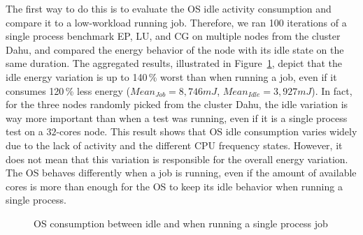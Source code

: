 The first way to do this is to evaluate the OS idle activity consumption and compare it to a low-workload running job.
Therefore, we ran 100 iterations of a single process benchmark \textsf{EP}, \textsf{LU}, and \textsf{CG} on multiple nodes from the cluster \textsf{Dahu}, and compared the energy behavior of the node with its idle state on the same duration.
The aggregated results, illustrated in Figure~\ref{fig:os-idle}, depict that the idle energy variation is up to 140\,\% worst than when running a job, even if it consumes 120\,\% less energy ($Mean_{Job}=8,746 mJ$, $Mean_{Idle}=3,927 mJ$).
In fact, for the three nodes randomly picked from the cluster \textsf{Dahu}, the idle variation is way more important than when a test was running, even if it is a single process test on a $32$-cores node.
This result shows that OS idle consumption varies widely due to the lack of activity and the different CPU frequency states. However, it does not mean that this variation is responsible for the overall energy variation.
The OS behaves differently when a job is running, even if the amount of available cores is more than enough for the OS to keep its idle behavior when running a single process.

\begin{figure}
    \caption{OS consumption between idle and when running a single process job}\label{fig:os-idle}
\end{figure}

